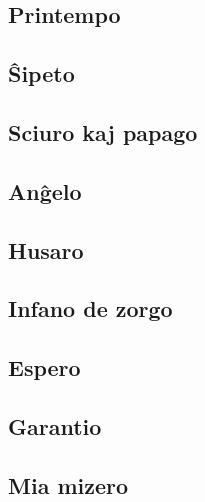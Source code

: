 \documentclass[a5paper,11pt,openany,twoside]{book}
\begin{document}
\subsection{Printempo}
\label{printempo}


\subsection{\^Sipeto}
\label{sxipeto}


\subsection{Sciuro kaj papago}
\label{sciuro}


\subsection{An\^gelo}
\label{angxelo}


\subsection{Husaro}
\label{husaro}


\subsection{Infano de zorgo}
\label{infano}


\subsection{Espero}
\label{espero}


\subsection{Garantio}
\label{garantio}


\vspace*{-5ex} %


\subsection{Mia mizero}
\label{mizero}

\end{document}
